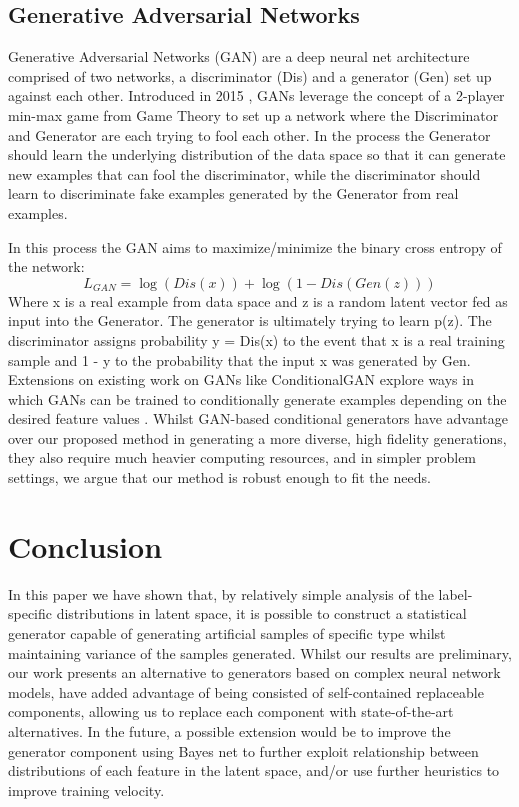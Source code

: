 \documentclass{article}
\begin{document}
\subsection{Generative Adversarial Networks}

Generative Adversarial Networks (GAN) are a deep neural net architecture comprised of two networks, a discriminator (Dis) and a generator (Gen) set up against each other. Introduced in 2015 \cite{Mirza}, GANs leverage the concept of a 2-player min-max game from Game Theory to set up a network where the Discriminator and Generator are each trying to fool each other. In the process the Generator should learn the underlying distribution of the data space so that it can generate new examples that can fool the discriminator, while the discriminator should learn to discriminate fake examples generated by the Generator from real examples.\par
In this process the GAN aims to maximize/minimize the binary cross entropy of the network:
\begin{equation} 
L_{GAN}=\log(Dis(x))+\log(1-Dis(Gen(z)))
\end{equation}
Where x is a real example from data space and z is a random latent vector fed as input into the Generator. The generator is ultimately trying to learn p(z). The discriminator assigns probability y = Dis(x)  to the event that x is a real training sample and 1 - y to the probability that the input x was generated by Gen. Extensions on existing work on GANs like ConditionalGAN explore ways in which GANs can be trained to conditionally generate examples depending on the desired feature values \cite{Mirza}. Whilst GAN-based conditional generators have advantage over our proposed method in generating a more diverse, high fidelity generations, they also require much heavier computing resources, and in simpler problem settings, we argue that our method is robust enough to fit the needs.

\section{Conclusion}

In this paper we have shown that, by relatively simple analysis of the label-specific distributions in latent space, it is possible to construct a statistical generator capable of generating artificial samples of specific type whilst maintaining variance of the samples generated. Whilst our results are preliminary, our work presents an alternative to generators based on complex neural network models, have added advantage of being consisted of self-contained replaceable components, allowing us to replace each component with state-of-the-art alternatives. In the future, a possible extension would be to improve the generator component using Bayes net to further exploit relationship between distributions of each feature in the latent space, and/or use further heuristics to improve training velocity. 

\medskip



\end{document}
